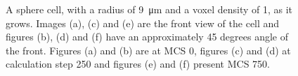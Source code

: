 \begin{figure}[ht]
\begin{center}
{	}
	\end{center}
	\begin{center}
	\end{center}
	\caption[Growth of a sphere cell with a radius of 9]{\label{img:GrowthSphereCellRadius9}A sphere cell, with a radius of \SI{9}{\micro\metre} and a voxel density of 1, as it grows. Images (a), (c) and (e) are the front view of the cell and figures (b), (d) and (f) have an approximately 45 degrees angle of the front. Figures (a) and (b) are at \ac{MCS} 0, figures (c) and (d) at calculation step 250 and figures (e) and (f) present \ac{MCS} 750.}
\end{figure}


